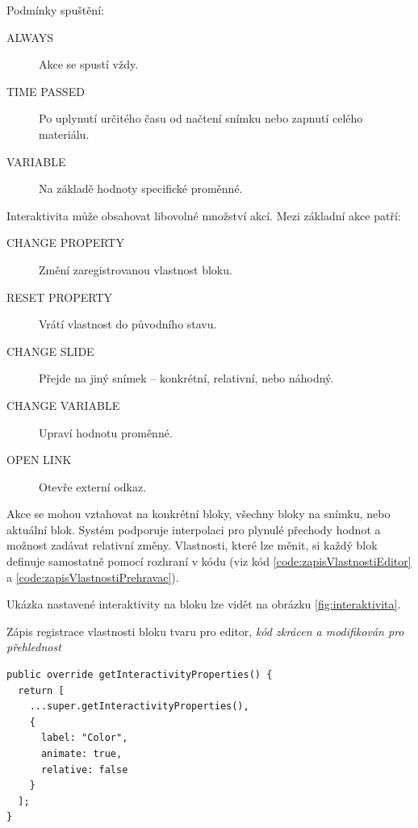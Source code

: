 Podmínky spuštění:
\begin{description}
  \item[ALWAYS] Akce se spustí vždy.
  \item[TIME PASSED] Po uplynutí určitého času od načtení snímku nebo zapnutí celého materiálu.
  \item[VARIABLE] Na základě hodnoty specifické proměnné.
\end{description}

Interaktivita může obsahovat libovolné množství akcí. Mezi základní akce patří:

\begin{description}
  \item[CHANGE PROPERTY] Změní zaregistrovanou vlastnost bloku.
  \item[RESET PROPERTY] Vrátí vlastnost do původního stavu.
  \item[CHANGE SLIDE] Přejde na jiný snímek – konkrétní, relativní, nebo náhodný.
  \item[CHANGE VARIABLE] Upraví hodnotu proměnné.
  \item[OPEN LINK] Otevře externí odkaz.
\end{description}

Akce se mohou vztahovat na konkrétní bloky, všechny bloky na snímku, nebo aktuální blok. 
Systém podporuje interpolaci pro plynulé přechody hodnot a možnost zadávat relativní změny.
Vlastnosti, které lze měnit, si každý blok definuje samostatně pomocí rozhraní v kódu (viz kód \ref{code:zapisVlastnostiEditor} a \ref{code:zapisVlastnostiPrehravac}).

Ukázka nastavené interaktivity na bloku lze vidět na obrázku \ref{fig:interaktivita}.

\begin{listing}[ht!]
\caption[Zápis registrace vlastnosti bloku tvaru pro editor]{Zápis registrace vlastnosti bloku tvaru pro editor, \textit{kód zkrácen a modifikován pro přehlednost}}\label{code:zapisVlastnostiEditor}
\begin{verbatim}
public override getInteractivityProperties() {
  return [
    ...super.getInteractivityProperties(),
    {
      label: "Color",
      animate: true,
      relative: false
    }
  ];
}
\end{verbatim}
\end{listing}



